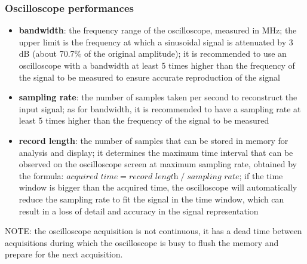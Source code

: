 \subsubsection*{Oscilloscope performances}
\begin{itemize}
	\item \textbf{bandwidth}: the frequency range of the oscilloscope, measured in MHz; the upper limit is the frequency at which
	a sinusoidal signal is attenuated by 3 dB (about 70.7\% of the original amplitude); it is recommended to use an oscilloscope
	with a bandwidth at least 5 times higher than the frequency of the signal to be measured to ensure accurate
	reproduction of the signal 
	\item \textbf{sampling rate}: the number of samples taken per second to reconstruct the input signal; as for bandwidth, it is
	recommended to have a sampling rate at least 5 times higher than the frequency of the signal to be measured
	\item \textbf{record length}: the number of samples that can be stored in memory for analysis and display; it determines the
	maximum time interval that can be observed on the oscilloscope screen at maximum sampling rate, obtained by the formula: 
	\(\textit{acquired time} = \textit{record length} \; / \; \textit{sampling rate}\); if the time window is bigger than the
	acquired time, the oscilloscope will automatically reduce the sampling rate to fit the signal in the time window, which can
	result in a loss of detail and accuracy in the signal representation
\end{itemize}
NOTE: the oscilloscope acquisition is not continuous, it has a dead time between acquisitions during which the oscilloscope
is busy to flush the memory and prepare for the next acquisition.

